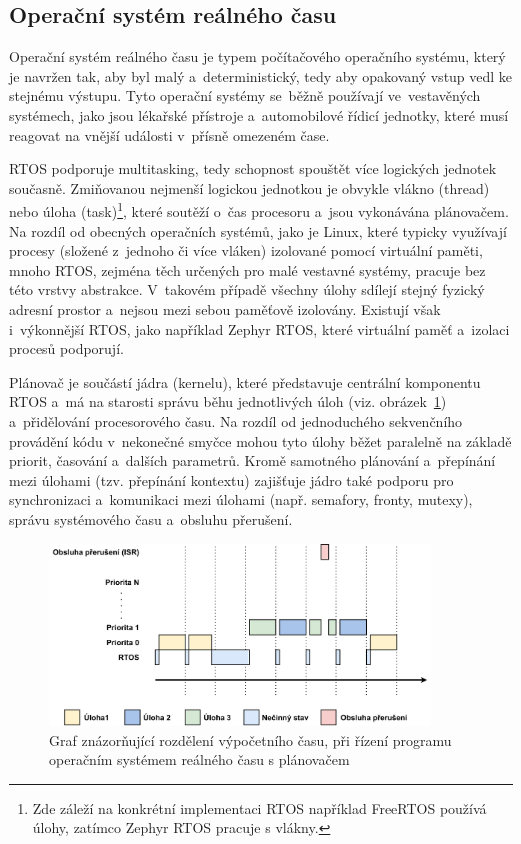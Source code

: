 \subsection{Operační systém reálného času}
Operační systém reálného času je typem počítačového operačního systému, který je navržen tak, aby byl malý a~deterministický, tedy aby opakovaný vstup vedl ke stejnému výstupu. Tyto operační systémy se~běžně používají ve~vestavěných systémech, jako jsou lékařské přístroje a~automobilové řídicí jednotky, které musí reagovat na vnější události v~přísně omezeném čase.~\cite{freertos_what_is_rtos}

RTOS podporuje multitasking, tedy schopnost spouštět více logických jednotek současně. Zmiňovanou nejmenší logickou jednotkou je obvykle vlákno (thread) nebo úloha (task)\footnote{Zde záleží na konkrétní implementaci RTOS například FreeRTOS používá úlohy, zatímco Zephyr RTOS pracuje s vlákny.}, které soutěží o~čas procesoru a~jsou vykonávána plánovačem. Na rozdíl od obecných operačních systémů, jako je Linux, které typicky využívají procesy (složené z~jednoho či více vláken) izolované pomocí virtuální paměti, mnoho RTOS, zejména těch určených pro malé vestavné systémy, pracuje bez této vrstvy abstrakce. V~takovém případě všechny úlohy sdílejí stejný fyzický adresní prostor a~nejsou mezi sebou paměťově izolovány. Existují však i~výkonnější RTOS, jako například Zephyr RTOS, které virtuální paměť a~izolaci procesů podporují.~\cite{freertos_what_is_rtos}

Plánovač je součástí jádra (kernelu), které představuje centrální komponentu RTOS a~má na starosti správu běhu jednotlivých úloh (viz. obrázek~\ref{fig:rtos-scheduling}) a~přidělování procesorového času. Na rozdíl od jednoduchého sekvenčního provádění kódu v~nekonečné smyčce mohou tyto úlohy běžet paralelně na základě priorit, časování a~dalších parametrů. Kromě samotného plánování a~přepínání mezi úlohami (tzv. přepínání kontextu) zajišťuje jádro také podporu pro synchronizaci a~komunikaci mezi úlohami (např. semafory, fronty, mutexy), správu systémového času a~obsluhu přerušení.~\cite{freertos_book}

\begin{figure}[h]
    \centering
    \includegraphics[width=0.90\textwidth]{obrazky-figures/rtos_scheduling.pdf}
    
    \caption{Graf znázorňující rozdělení výpočetního času, při řízení programu operačním systémem reálného času s plánovačem~\cite{freertos_book}}
    \label{fig:rtos-scheduling}
\end{figure}

